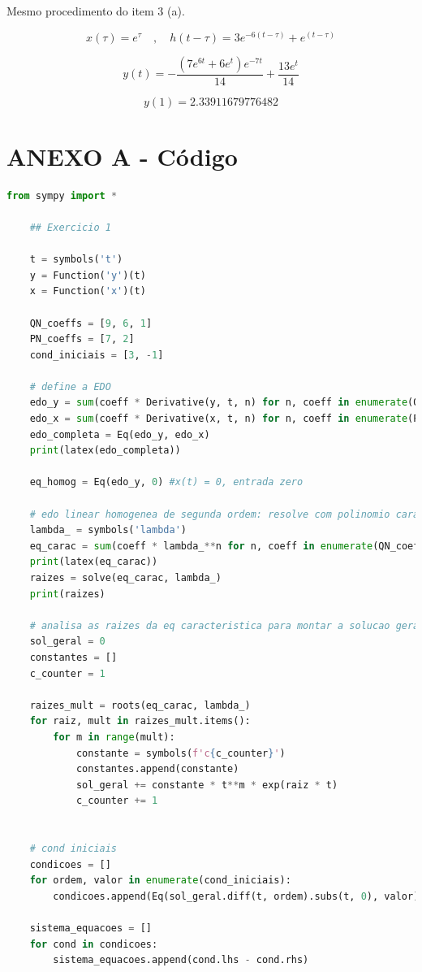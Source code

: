 \documentclass[12pt]{scrartcl}
\begin{document}
Mesmo procedimento do item 3 (a). 

\[ x(\tau) = e^{\tau} \quad , \quad h(t - \tau) = 3 e^{-6(t - \tau)} + e^{(t - \tau)} \]

\[ y(t) = - \frac{\left(7 e^{6 t} + 6 e^{t}\right) e^{- 7 t}}{14} + \frac{13 e^{t}}{14} \]

\[ y(1) = 2.33911679776482 \]

\newpage

\section*{ANEXO A - Código}

\begin{lstlisting}[language=Python, breaklines=true, basicstyle=\scriptsize]
    from sympy import *

    ## Exercicio 1

    t = symbols('t')
    y = Function('y')(t)
    x = Function('x')(t)

    QN_coeffs = [9, 6, 1]
    PN_coeffs = [7, 2]
    cond_iniciais = [3, -1]

    # define a EDO
    edo_y = sum(coeff * Derivative(y, t, n) for n, coeff in enumerate(QN_coeffs))
    edo_x = sum(coeff * Derivative(x, t, n) for n, coeff in enumerate(PN_coeffs))
    edo_completa = Eq(edo_y, edo_x)
    print(latex(edo_completa))

    eq_homog = Eq(edo_y, 0) #x(t) = 0, entrada zero

    # edo linear homogenea de segunda ordem: resolve com polinomio caracteristico
    lambda_ = symbols('lambda')
    eq_carac = sum(coeff * lambda_**n for n, coeff in enumerate(QN_coeffs))
    print(latex(eq_carac))
    raizes = solve(eq_carac, lambda_)
    print(raizes)

    # analisa as raizes da eq caracteristica para montar a solucao geral
    sol_geral = 0
    constantes = []
    c_counter = 1

    raizes_mult = roots(eq_carac, lambda_)
    for raiz, mult in raizes_mult.items():
        for m in range(mult):
            constante = symbols(f'c{c_counter}')
            constantes.append(constante)
            sol_geral += constante * t**m * exp(raiz * t)
            c_counter += 1


    # cond iniciais
    condicoes = []
    for ordem, valor in enumerate(cond_iniciais):
        condicoes.append(Eq(sol_geral.diff(t, ordem).subs(t, 0), valor))

    sistema_equacoes = []
    for cond in condicoes:
        sistema_equacoes.append(cond.lhs - cond.rhs)


\end{lstlisting}
\end{document}
